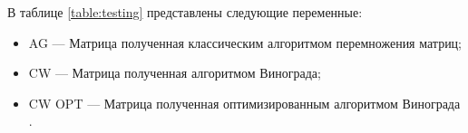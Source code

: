 В таблице \ref{table:testing} представлены следующие переменные:
\begin{itemize}
	\item AG --- Матрица полученная классическим алгоритмом перемножения матриц;
	\item CW --- Матрица полученная алгоритмом Винограда;
	\item CW OPT --- Матрица полученная оптимизированным алгоритмом Винограда .
\end{itemize}

\begin{table}[ht!]
	\renewcommand{\arraystretch}{1.8}
	\caption{Тестовые случаи}
\end{table}
